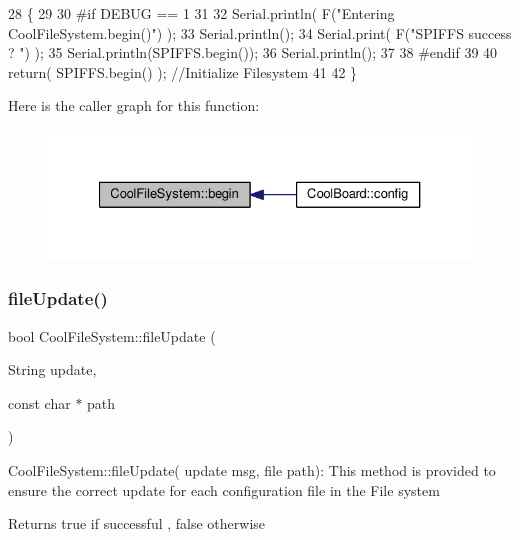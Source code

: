 \begin{DoxyCode}
28 \{
29 
30 \textcolor{preprocessor}{#if DEBUG == 1}
31 
32     Serial.println( F(\textcolor{stringliteral}{"Entering CoolFileSystem.begin()"}) );
33     Serial.println();   
34     Serial.print( F(\textcolor{stringliteral}{"SPIFFS success ? "}) );
35     Serial.println(SPIFFS.begin());
36     Serial.println();
37 
38 \textcolor{preprocessor}{#endif}
39 
40     \textcolor{keywordflow}{return}( SPIFFS.begin() );                                   \textcolor{comment}{//Initialize Filesystem}
41 
42 \}
\end{DoxyCode}
Here is the caller graph for this function\+:\nopagebreak
\begin{figure}[H]
\begin{center}
\leavevmode
\includegraphics[width=327pt]{db/d0c/class_cool_file_system_a6ba6f666ed4c530174f8569d2c636748_icgraph}
\end{center}
\end{figure}
\mbox{\label{class_cool_file_system_a13f2958f5b87757c31fc53797a30d23a}} 
\subsubsection{\texorpdfstring{file\+Update()}{fileUpdate()}}
{\footnotesize\ttfamily bool Cool\+File\+System\+::file\+Update (\begin{DoxyParamCaption}\item[{String}]{update,  }\item[{const char $\ast$}]{path }\end{DoxyParamCaption})}

Cool\+File\+System\+::file\+Update( update msg, file path)\+: This method is provided to ensure the correct update for each configuration file in the File system

\begin{DoxyReturn}{Returns}
true if successful , false otherwise 
\end{DoxyReturn}


